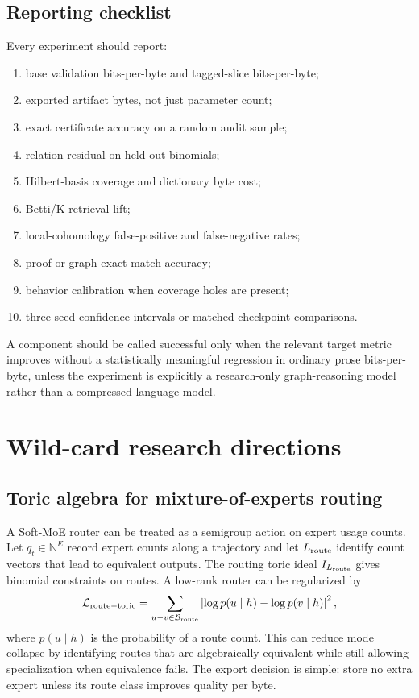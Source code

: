 \documentclass[11pt]{article}
\theoremstyle{definition}
\newcommand{\NN}{\mathbb{N}}
\begin{document}
\subsection{Reporting checklist}
Every experiment should report:
\begin{enumerate}[leftmargin=*]
\item base validation bits-per-byte and tagged-slice bits-per-byte;
\item exported artifact bytes, not just parameter count;
\item exact certificate accuracy on a random audit sample;
\item relation residual on held-out binomials;
\item Hilbert-basis coverage and dictionary byte cost;
\item Betti/K retrieval lift;
\item local-cohomology false-positive and false-negative rates;
\item proof or graph exact-match accuracy;
\item behavior calibration when coverage holes are present;
\item three-seed confidence intervals or matched-checkpoint comparisons.
\end{enumerate}
A component should be called successful only when the relevant target metric improves without a statistically meaningful regression in ordinary prose bits-per-byte, unless the experiment is explicitly a research-only graph-reasoning model rather than a compressed language model.

\section{Wild-card research directions}
\subsection{Toric algebra for mixture-of-experts routing}
A Soft-MoE router can be treated as a semigroup action on expert usage counts.  Let \(q_t\in\NN^E\) record expert counts along a trajectory and let \(L_{\rm route}\) identify count vectors that lead to equivalent outputs.  The routing toric ideal \(I_{L_{\rm route}}\) gives binomial constraints on routes.  A low-rank router can be regularized by
\[
\mathcal L_{\rm route-toric}=\sum_{u-v\in\mathcal B_{\rm route}}
\left|\log p(u\mid h)-\log p(v\mid h)\right|^2,
\]
where \(p(u\mid h)\) is the probability of a route count.  This can reduce mode collapse by identifying routes that are algebraically equivalent while still allowing specialization when equivalence fails.  The export decision is simple: store no extra expert unless its route class improves quality per byte.
\end{document}

